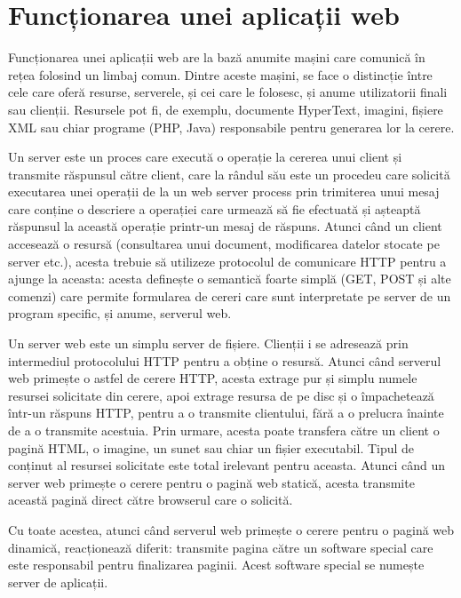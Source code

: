 \section{Funcționarea unei aplicații web}

Funcționarea unei aplicații web are la bază anumite mașini care comunică în rețea folosind un limbaj comun.
Dintre aceste mașini, se face o distincție între cele care oferă resurse, serverele, și cei care le folosesc, și anume utilizatorii finali sau clienții. Resursele pot fi, de exemplu, documente HyperText, imagini, fișiere XML sau chiar programe (PHP, Java) responsabile pentru generarea lor la cerere.\newline

Un server este un proces care execută o operație la cererea unui client și transmite răspunsul către client, care la rândul său este un procedeu care solicită executarea unei operații de la un web server process prin trimiterea unui mesaj care conține o descriere a operației care urmează să fie efectuată și așteaptă răspunsul la această operație printr-un mesaj de răspuns.
Atunci când un client accesează o resursă (consultarea unui document, modificarea datelor stocate pe server etc.), acesta trebuie să utilizeze protocolul de comunicare HTTP pentru a ajunge la aceasta: acesta definește o semantică foarte simplă (GET, POST și alte comenzi) care permite formularea de cereri care sunt interpretate pe server de un program specific, și anume, serverul web.\newline

Un server web este un simplu server de fișiere. Clienții i se adresează prin intermediul protocolului HTTP pentru a obține o resursă. Atunci când serverul web primește o astfel de cerere HTTP, acesta extrage pur și simplu numele resursei solicitate din cerere, apoi extrage resursa de pe disc și o împachetează într-un răspuns HTTP, pentru a o transmite clientului, fără a o prelucra înainte de a o transmite acestuia. Prin urmare, acesta poate transfera către un client o pagină HTML, o imagine, un sunet sau chiar un fișier executabil. Tipul de conținut al resursei solicitate este total irelevant pentru aceasta.
Atunci când un server web primește o cerere pentru o pagină web statică, acesta transmite această pagină direct către browserul care o solicită.\newline

Cu toate acestea, atunci când serverul web primește o cerere pentru o pagină web dinamică, reacționează diferit: transmite pagina către un software special care este responsabil pentru finalizarea paginii. Acest software special se numește server de aplicații.\newline

